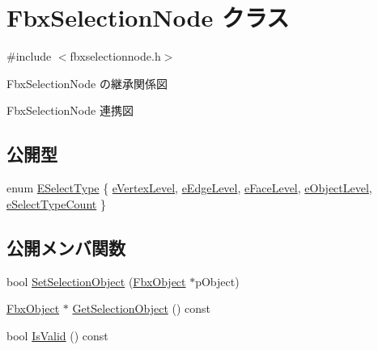 \hypertarget{class_fbx_selection_node}{}\section{Fbx\+Selection\+Node クラス}
\label{class_fbx_selection_node}


{\ttfamily \#include $<$fbxselectionnode.\+h$>$}



Fbx\+Selection\+Node の継承関係図


Fbx\+Selection\+Node 連携図
\subsection*{公開型}
\begin{DoxyCompactItemize}
\item 
enum \hyperlink{class_fbx_selection_node_aa24cf47b60ff436a1cce9409da37e78f}{E\+Select\+Type} \{ \newline
\hyperlink{class_fbx_selection_node_aa24cf47b60ff436a1cce9409da37e78fa4b0313e9b717470c120c183febb4cc18}{e\+Vertex\+Level}, 
\hyperlink{class_fbx_selection_node_aa24cf47b60ff436a1cce9409da37e78faa3159ebdf64f71125b01fbc012ffa57a}{e\+Edge\+Level}, 
\hyperlink{class_fbx_selection_node_aa24cf47b60ff436a1cce9409da37e78fa0a0a561141a2474c800b732fd42428cc}{e\+Face\+Level}, 
\hyperlink{class_fbx_selection_node_aa24cf47b60ff436a1cce9409da37e78fa5c26b8b56bfce101fe25c1b7f1bd9878}{e\+Object\+Level}, 
\newline
\hyperlink{class_fbx_selection_node_aa24cf47b60ff436a1cce9409da37e78fa6f7e60aadbb76284e3352814a5a4f299}{e\+Select\+Type\+Count}
 \}
\end{DoxyCompactItemize}
\subsection*{公開メンバ関数}
\begin{DoxyCompactItemize}
\item 
bool \hyperlink{class_fbx_selection_node_a6682d7ec3a7f7b9083962c212e7badd2}{Set\+Selection\+Object} (\hyperlink{class_fbx_object}{Fbx\+Object} $\ast$p\+Object)
\item 
\hyperlink{class_fbx_object}{Fbx\+Object} $\ast$ \hyperlink{class_fbx_selection_node_a1c78c8d31e14c7cb99e059963eee820c}{Get\+Selection\+Object} () const
\item 
bool \hyperlink{class_fbx_selection_node_a600d1609bd33e1453f082a971a9498f9}{Is\+Valid} () const
\end{DoxyCompactItemize}
